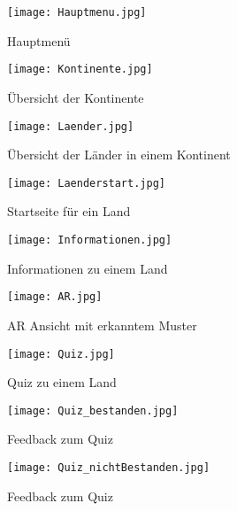 \begin{figure}[!htb]
  \texttt{[image: Hauptmenu.jpg]}
  \caption{Hauptmenü}\label{fig:Hauptmenu}
\endminipage\hfill
{}
  \texttt{[image: Kontinente.jpg]}
  \caption{Übersicht der Kontinente}\label{fig:Kontinente}
\endminipage\hfill
\end{figure}

\begin{figure}[!htb]
  \texttt{[image: Laender.jpg]}
  \caption{Übersicht der Länder in einem Kontinent}\label{fig:Laender}
\endminipage\hfill
{}
  \texttt{[image: Laenderstart.jpg]}
  \caption{Startseite für ein Land}\label{fig:Laenderstart}
\endminipage\hfill
\end{figure}

\begin{figure}[!htb]
  \texttt{[image: Informationen.jpg]}
  \caption{Informationen zu einem Land}\label{fig:Informationen}
\endminipage\hfill
{}
  \texttt{[image: AR.jpg]}
  \caption{AR Ansicht mit erkanntem Muster}\label{fig:AR}
\endminipage\hfill
\end{figure}

\begin{figure}[!htb]
  \texttt{[image: Quiz.jpg]}
  \caption{Quiz zu einem Land}\label{fig:Quiz}
\endminipage\hfill
{}
  \texttt{[image: Quiz\_bestanden.jpg]}
  \caption{Feedback zum Quiz}\label{fig:Quiz_bestanden}
\endminipage\hfill
\end{figure}

\begin{figure}[!htb]
  \texttt{[image: Quiz\_nichtBestanden.jpg]}
  \caption{Feedback zum Quiz}\label{fig:Quiz_nichtBestanden}
\endminipage\hfill
\end{figure}